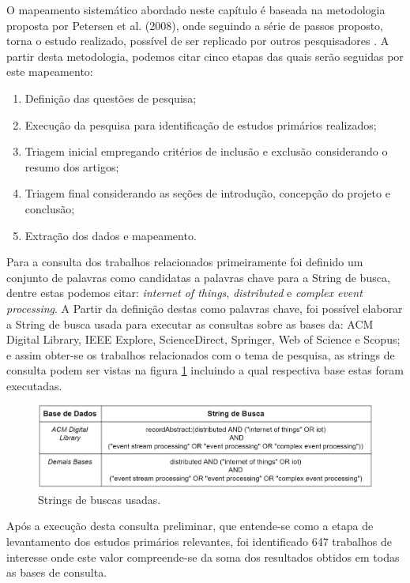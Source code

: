 \documentclass[tid,table]{texufpel} %
\begin{document}
O mapeamento sistemático abordado neste capítulo é baseada na metodologia proposta por Petersen et al. (2008), onde seguindo a série de passos proposto, torna o estudo realizado, possível de ser replicado por outros pesquisadores \cite{petersen08}. A partir desta metodologia, podemos citar cinco etapas das quais serão seguidas por este mapeamento:

\begin{enumerate}
	\item Definição das questões de pesquisa;
	\item Execução da pesquisa para identificação de estudos primários realizados;
	\item Triagem inicial empregando critérios de inclusão e exclusão considerando o resumo dos artigos;
	\item Triagem final considerando as seções de introdução, concepção do projeto e conclusão;
	\item Extração dos dados e mapeamento.
	

\end{enumerate}  

Para a consulta dos trabalhos relacionados primeiramente foi definido um conjunto de palavras como candidatas a palavras chave para a String de busca, dentre estas podemos citar: \textit{internet of things}, \textit{distributed} e \textit{complex event processing}. A Partir da definição destas como palavras chave, foi possível elaborar a String de busca usada para executar as consultas sobre as bases da: ACM Digital Library, IEEE Explore, ScienceDirect, Springer, Web of Science e Scopus; e assim obter-se os trabalhos relacionados com o tema de pesquisa, as strings de consulta podem ser vistas na figura \ref{tab:stringBusca} incluindo a qual respectiva base estas foram executadas.



\begin{figure}[ht]
	\centering
	\includegraphics[width=1\textwidth]{imagens/tabela_string_busca.png}
	\caption{Strings de buscas usadas.}
	\label{tab:stringBusca}
\end{figure}

Após a execução desta consulta preliminar, que entende-se como a etapa de levantamento dos estudos primários relevantes, foi identificado 647 trabalhos de interesse onde este valor  compreende-se da soma dos resultados obtidos em todas as bases de consulta.
\end{document}
